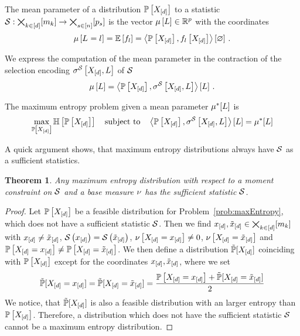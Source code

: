 \documentclass[aps,onecolumn,nofootinbib,pra]{article}
\newtheorem{theorem}{Theorem}
\begin{document}
    The mean parameter of a distribution $\mathbb{P}\left[X_{[d]}\right]$ to a statistic $\mathcal{S}:\bigtimes_{k\in[d]}[m_{k}]\rightarrow\bigtimes_{s\in[n]}[p_{s}]$ is the vector $\mu\left[L\right]\in\mathbb{R}^p$ with the coordinates
    \begin{align*}
        \mu\left[L_{}=l_{}\right] = \mathbb{E}\left[f_{l}\right] = \left\langle \mathbb{P}\left[X_{[d]}\right],f_{l}\left[X_{[d]}\right]\right\rangle \left[ \varnothing \right] \, .
    \end{align*}

    We express the computation of the mean parameter in the contraction of the selection encoding $\sigma^{\mathcal{S}}\left[X_{[d]},L\right]$ of $\mathcal{S}$
    \begin{align*}
        \mu\left[L\right] = \left\langle \mathbb{P}\left[X_{[d]}\right],\sigma^{\mathcal{S}}\left[X_{[d]},L\right]\right\rangle \left[ L \right] \, .
    \end{align*}

    The maximum entropy problem given a mean parameter $\mu^*[L]$ is
    \begin{align*}
        \max_{\mathbb{P}\left[X_{[d]}\right]} \mathbb{H}\left[\mathbb{P}\left[X_{[d]}\right]\right] \quad \text{subject to} \quad \left\langle \mathbb{P}\left[X_{[d]}\right],\sigma^{\mathcal{S}}\left[X_{[d]},L\right]\right\rangle \left[ L \right] = \mu^*[L]
    \end{align*}

    A quick argument shows, that maximum entropy distributions always have $\mathcal{S}$ as a sufficient statistics.

    \begin{theorem}
        \label{the:maxEntWithSufficientStatistic}
        Any maximum entropy distribution with respect to a moment constraint on $\mathcal{S}$ and a base measure $\nu$ has the sufficient statistic $\mathcal{S}$.
    \end{theorem}
    \begin{proof}
        Let $\mathbb{P}\left[X_{[d]}\right]$ be a feasible distribution for Problem~\eqref{prob:maxEntropy}, which does not have a sufficient statistic $\mathcal{S}$.
        Then we find $x_{[d]},\tilde{x}_{[d]}\in\bigtimes_{k\in[d]}[m_{k}]$ with $x_{[d]}\neq\tilde{x}_{[d]}$, $\mathcal{S}\left(x_{[d]}\right)=\mathcal{S}\left(\tilde{x}_{[d]}\right)$, $\nu\left[X_{[d]}=x_{[d]}\right]\neq0$, $\nu\left[X_{[d]}=\tilde{x}_{[d]}\right]$ and $\mathbb{P}\left[X_{[d]}=x_{[d]}\right]\neq\mathbb{P}\left[X_{[d]}=\tilde{x}_{[d]}\right]$.
        We then define a distribution $\tilde{\mathbb{P}}[X_{[d]}]$ coinciding with $\mathbb{P}\left[X_{[d]}\right]$ except for the coordinates $x_{[d]},\tilde{x}_{[d]}$, where we set
        \begin{align*}
            \tilde{\mathbb{P}}[X_{[d]}=x_{[d]}] = \tilde{\mathbb{P}}[X_{[d]}=\tilde{x}_{[d]}] = \frac{\mathbb{P}\left[X_{[d]}=x_{[d]}\right]+\tilde{\mathbb{P}}[X_{[d]}=\tilde{x}_{[d]}]}{2}
        \end{align*}
        We notice, that $\tilde{\mathbb{P}}[X_{[d]}]$ is also a feasible distribution with an larger entropy than $\mathbb{P}\left[X_{[d]}\right]$.
        Therefore, a distribution which does not have the sufficient statistic $\mathcal{S}$ cannot be a maximum entropy distribution.
    \end{proof}
\end{document}
